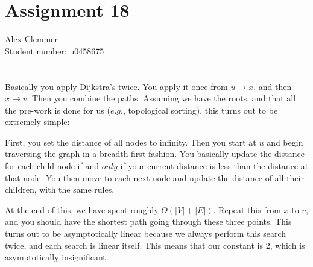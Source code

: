 \documentclass[a4paper]{article}
\begin{document}
\section*{Assignment 18}
Alex Clemmer\\
Student number: u0458675

\section*{}

Basically you apply Dijkstra's twice. You apply it once from $u \rightarrow x$, and then $x \rightarrow v$. Then you combine the paths. Assuming we have the roots, and that all the pre-work is done for us ($\textit{e.g.}$, topological sorting), this turns out to be extremely simple:

First, you set the distance of all nodes to infinity. Then you start at $u$ and begin traversing the graph in a breadth-first fashion. You basically update the distance for each child node if and $\textit{only}$ if your current distance is less than the distance at that node. You then move to each next node and update the distance of all their children, with the same rules.

At the end of this, we have spent roughly $O(|V| + |E|)$. Repeat this from $x$ to $v$, and you should have the shortest path going through these three points. This turns out to be asymptotically linear because we always perform this search twice, and each search is linear itself. This means that our constant is 2, which is asymptotically insignificant.
\end{document}
